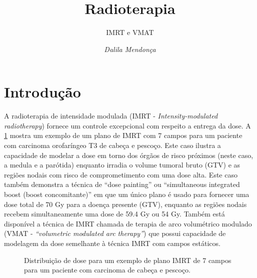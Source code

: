 \documentclass[11pt,a4paper]{article}
\title{\LobsterTwo\Huge{Radioterapia}}
\author{\LobsterTwo\Large{IMRT e VMAT}\nocite{*}}
\date{\LobsterTwo\textit{Dalila Mendonça}}
\newcounter{exemplo}
\begin{document}
	\maketitle

\section{Introdução}

	A radioterapia de intensidade modulada (IMRT - \textit{Intensity-modulated radiotherapy}) fornece um controle excepcional com respeito a entrega da dose. A \ref{fig:imrt7campos} mostra um exemplo de um plano de IMRT com 7 campos para um paciente com carcinoma orofaríngeo T3 de cabeça e pescoço. Este caso ilustra a capacidade de modelar a dose em torno dos órgãos de risco próximos (neste caso, a medula e a parótida) enquanto irradia o volume tumoral bruto (GTV) e as regiões nodais com risco de comprometimento com uma dose alta. Este caso também demonstra a técnica de “dose painting” ou “simultaneous integrated boost (boost concomitante)” em que um único plano é usado para fornecer uma dose total de 70 Gy para a doença presente (GTV), enquanto as regiões nodais recebem simultaneamente uma dose de 59.4 Gy ou 54 Gy. Também está disponível a técnica de IMRT chamada de terapia de arco volumétrico modulado (VMAT - \textit{``volumetric modulated arc therapy''})  que possui capacidade de modelagem da dose semelhante à técnica IMRT com campos estáticos.

	\begin{figure}[h]
		\centering
		\caption{Distribuição de dose para um exemplo de plano IMRT de 7 campos para um paciente com carcinoma de cabeça e pescoço.}
		\label{fig:imrt7campos}
	\end{figure}
\end{document}
